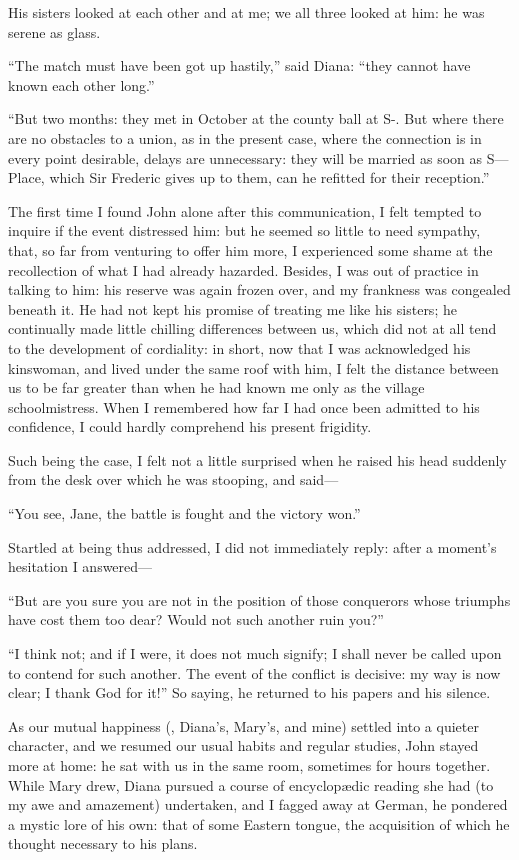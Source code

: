 His sisters looked at each other and at me; we all three looked at him:
he was serene as glass.

\enquote{The match must have been got up hastily,} said Diana:
\enquote{they cannot have known each other long.}

\enquote{But two months: they met in October at the county ball at S-. 
But where there are no obstacles to a union, as in the present case,
where the connection is in every point desirable, delays are
unnecessary: they will be married as soon as S--- Place, which Sir
Frederic gives up to them, can he refitted for their reception.}

The first time I found \St{} John alone after this communication, I felt
tempted to inquire if the event distressed him: but he seemed so little
to need sympathy, that, so far from venturing to offer him more, I
experienced some shame at the recollection of what I had already
hazarded. Besides, I was out of practice in talking to him: his reserve
was again frozen over, and my frankness was congealed beneath it. He
had not kept his promise of treating me like his sisters; he continually
made little chilling differences between us, which did not at all tend
to the development of cordiality: in short, now that I was acknowledged
his kinswoman, and lived under the same roof with him, I felt the
distance between us to be far greater than when he had known me only as
the village schoolmistress. When I remembered how far I had once been
admitted to his confidence, I could hardly comprehend his present
frigidity.

Such being the case, I felt not a little surprised when he raised his
head suddenly from the desk over which he was stooping, and said---

\enquote{You see, Jane, the battle is fought and the victory won.}

Startled at being thus addressed, I did not immediately reply: after a
moment's hesitation I answered---

\enquote{But are you sure you are not in the position of those
conquerors whose triumphs have cost them too dear? Would not such
another ruin you?}

\enquote{I think not; and if I were, it does not much signify; I shall
never be called upon to contend for such another. The event of the
conflict is decisive: my way is now clear; I thank God for it!} So
saying, he returned to his papers and his silence.

As our mutual happiness (\emph{\ie}, Diana's, Mary's, and mine) settled
into a quieter character, and we resumed our usual habits and regular
studies, \St{} John stayed more at home: he sat with us in the same room,
sometimes for hours together. While Mary drew, Diana pursued a course
of encyclopædic reading she had (to my awe and amazement) undertaken,
and I fagged away at German, he pondered a mystic lore of his own: that
of some Eastern tongue, the acquisition of which he thought necessary to
his plans.


